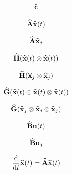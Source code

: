 \documentclass[12 pt]{article}
\begin{document}

\begin{align*}
    \crom
\end{align*}

\begin{align*}
    \Arom\xrom(t)
\end{align*}

\begin{align*}
    \Arom\xrom_{j}
\end{align*}

\begin{align*}
    \Hrom(\xrom(t) \otimes \xrom(t))
\end{align*}

\begin{align*}
    \Hrom(\xrom_{j} \otimes \xrom_{j})
\end{align*}

\begin{align*}
    \Grom(\xrom(t) \otimes \xrom(t) \otimes \xrom(t))
\end{align*}

\begin{align*}
    \Grom(\xrom_{j} \otimes \xrom_{j} \otimes \xrom_{j})
\end{align*}

\begin{align*}
    \Brom\ufom(t)
\end{align*}

\begin{align*}
    \Brom\ufom_{j}
\end{align*}


\begin{align*}
    \ddt\xrom(t)
    = \Arom\xrom(t)
\end{align*}
\end{document}
